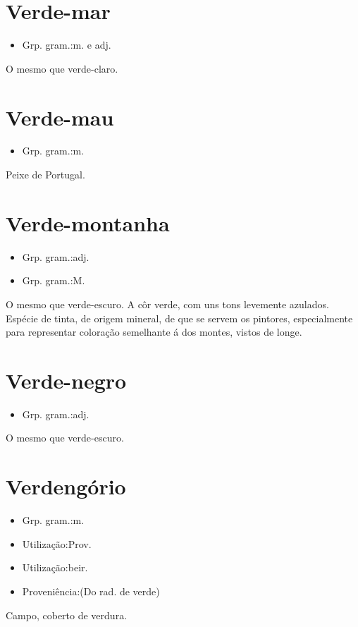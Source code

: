 \documentclass{article}
\begin{document}
\section{Verde-mar}
\begin{itemize}
\item {Grp. gram.:m.  e  adj.}
\end{itemize}
O mesmo que \textunderscore verde-claro\textunderscore .
\section{Verde-mau}
\begin{itemize}
\item {Grp. gram.:m.}
\end{itemize}
Peixe de Portugal.
\section{Verde-montanha}
\begin{itemize}
\item {Grp. gram.:adj.}
\end{itemize}
\begin{itemize}
\item {Grp. gram.:M.}
\end{itemize}
O mesmo que \textunderscore verde-escuro\textunderscore .
A côr verde, com uns tons levemente azulados.
Espécie de tinta, de origem mineral, de que se servem os pintores, especialmente para representar coloração semelhante á dos montes, vistos de longe.
\section{Verde-negro}
\begin{itemize}
\item {Grp. gram.:adj.}
\end{itemize}
O mesmo que \textunderscore verde-escuro\textunderscore .
\section{Verdengório}
\begin{itemize}
\item {Grp. gram.:m.}
\end{itemize}
\begin{itemize}
\item {Utilização:Prov.}
\end{itemize}
\begin{itemize}
\item {Utilização:beir.}
\end{itemize}
\begin{itemize}
\item {Proveniência:(Do rad. de \textunderscore verde\textunderscore )}
\end{itemize}
Campo, coberto de verdura.
\end{document}

